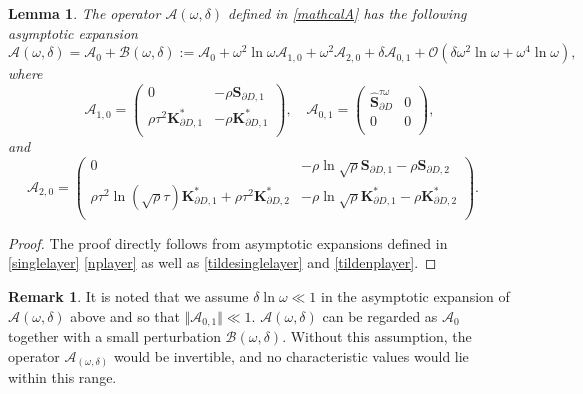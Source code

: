 \documentclass[10pt,reqno,oneside]{amsart}%
\newtheorem{lem}{Lemma}[section]
\theoremstyle{definition}
\newtheorem{rem}{Remark}[section]
\theoremstyle{remark}
\numberwithin{equation}{section}
\numberwithin{equation}{section}
\begin{document}
\begin{lem}
The operator $\mathcal{A}(\omega, \delta)$ defined in \eqref{mathcalA} has the following asymptotic expansion
$$
\mathcal{A}(\omega,\delta)=\mathcal{A}_0+\mathcal{B}(\omega,\delta):=\mathcal{A}_0+\omega^2\ln\omega\mathcal{A}_{1,0}+\omega^2\mathcal{A}_{2,0}+\delta\mathcal{A}_{0,1}
+\mathcal{O}(\delta\omega^2\ln{\omega}+\omega^4\ln{\omega}),
$$
where
$$
\mathcal{A}_{1,0}=
\begin{pmatrix}
0 & -\rho{\mathbf{S}}_{\partial D,1}\\
\rho\tau^2\mathbf{K}_{\partial D,1}^{*} &
-\rho\mathbf{K}_{\partial D,1}^{*}\\
\end{pmatrix},\quad
\mathcal{A}_{0,1}=
\begin{pmatrix}
\hat{\mathbf{S}}_{\partial D}^{\tau\omega} & 0\\
0 & 0\\
\end{pmatrix},
$$
and
$$
\mathcal{A}_{2,0}=
\begin{pmatrix}
0 & -\rho\ln\sqrt{\rho}\mathbf{S}_{\partial D,1}-\rho\mathbf{S}_{\partial D,2}\\
\rho\tau^2\ln(\sqrt{\rho}\tau)\mathbf{K}_{\partial D,1}^{*} +\rho\tau^2\mathbf{K}_{\partial D,2}^{*} &
-\rho\ln\sqrt{\rho}\mathbf{K}_{\partial D,1}^{*}-\rho\mathbf{K}_{\partial D,2}^{*}\\
\end{pmatrix}.\quad
$$
\end{lem}
\begin{proof}
The proof directly follows from asymptotic expansions defined in \eqref{singlelayer} \eqref{nplayer} as well as \eqref{tildesinglelayer} and \eqref{tildenplayer}.
\end{proof}

\begin{rem}\label{regime_rem}
		It is noted that we assume $\delta \ln \omega \ll 1$ in the asymptotic expansion of $\mathcal{A}(\omega,\delta)$ above and so that $\Vert \mathcal{A}_{0,1} \Vert \ll 1$. $\mathcal{A}(\omega,\delta)$ can be regarded as $\mathcal{A}_0$ together with a small perturbation $\mathcal{B}(\omega,\delta)$. Without this assumption, the operator $\mathcal{A}_({\omega,\delta})$ would be invertible, and no characteristic values would lie within this range.
\end{rem}
\end{document}
